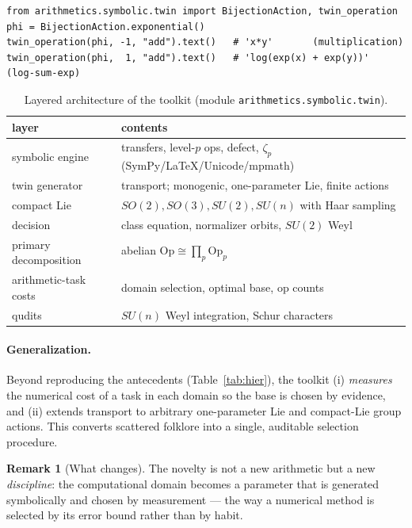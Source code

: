 \documentclass[11pt,a4paper]{article}
\newcommand{\Op}{\mathrm{Op}}
\newcommand{\code}[1]{\texttt{#1}}
\theoremstyle{definition}
\newtheorem{remark}{Remark}
\begin{document}
\begin{lstlisting}
from arithmetics.symbolic.twin import BijectionAction, twin_operation
phi = BijectionAction.exponential()
twin_operation(phi, -1, "add").text()   # 'x*y'       (multiplication)
twin_operation(phi,  1, "add").text()   # 'log(exp(x) + exp(y))'  (log-sum-exp)
\end{lstlisting}

\begin{table}[ht]
\centering
\caption{Layered architecture of the toolkit
(module \code{arithmetics.symbolic.twin}).}
\label{tab:arch}
\begin{tabular}{ll}
\toprule
layer & contents \\
\midrule
symbolic engine & transfers, level-$p$ ops, defect, $\zeta_p$ (SymPy/\LaTeX/Unicode/mpmath) \\
twin generator & transport; monogenic, one-parameter Lie, finite actions \\
compact Lie & $SO(2),SO(3),SU(2),SU(n)$ with Haar sampling \\
decision & class equation, normalizer orbits, $SU(2)$ Weyl \\
primary decomposition & abelian $\Op\cong\prod_p\Op_p$ \\
arithmetic-task costs & domain selection, optimal base, op counts \\
qudits & $SU(n)$ Weyl integration, Schur characters \\
\bottomrule
\end{tabular}
\end{table}

\paragraph{Generalization.} Beyond reproducing the antecedents
(Table~\ref{tab:hier}), the toolkit (i) \emph{measures} the numerical cost of a
task in each domain so the base is chosen by evidence, and (ii) extends transport
to arbitrary one-parameter Lie and compact-Lie group actions. This converts
scattered folklore into a single, auditable selection procedure.

\begin{remark}[What changes]
The novelty is not a new arithmetic but a new \emph{discipline}: the
computational domain becomes a parameter that is generated symbolically and
chosen by measurement --- the way a numerical method is selected by its error
bound rather than by habit.
\end{remark}
\end{document}
